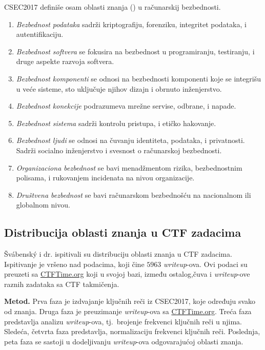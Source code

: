 \documentclass[12pt, a4paper, twocolumn]{article}
\begin{document}
CSEC2017 definiše osam oblasti znanja () u računarskij bezbednosti.
\begin{enumerate}
    \item \emph{Bezbednost podataka} sadrži kriptografiju, forenziku, 
        integritet podataka, i autentifikaciju.
    \item \emph{Bezbednost softvera} se fokusira na bezbednost u 
        programiranju, testiranju, i druge aspekte razvoja softvera.
    \item \emph{Bezbednost komponenti} se odnosi na bezbednosti komponenti 
        koje se integrišu u veće sisteme, sto uključuje njihov dizajn i 
        obrnuto inženjerstvo.
    \item \emph{Bezbednost konekcije} podrazumeva mrežne servise, odbrane, i 
        napade.
    \item \emph{Bezbednost sistema} sadrži kontrolu pristupa, i etičko 
        hakovanje.
    \item \emph{Bezbednost ljudi} se odnosi na čuvanju identiteta, podataka, 
        i privatnosti. Sadrži socialno inženjerstvo i svesnost o računarskoj 
        bezbednosti.
    \item \emph{Organizaciona bezbednost} se bavi menadžmentom rizika, 
        bezbednostnim polisama, i rukovanjem incidenata na nivou organizacije.
    \item \emph{Društvena bezbednost} se bavi računarskom bezbednošću 
        na nacionalnom ili globalnom nivou.
\end{enumerate}

\subsection{Distribucija oblasti znanja u CTF zadacima}

Švábenský i dr.\cite{ctf_skills} ispitivali su distribuciju oblasti znanja u 
CTF zadacima. Ispitivanje je vršeno nad podacima, koji čine $5963$ 
\emph{writeup}-ova. Ovi podaci su preuzeti sa \url{CTFTime.org} koji u svojoj 
bazi, između ostalog,čuva i \emph{writeup}-ove raznih zadataka sa CTF 
takmičenja.\cite{ctf_time}

\textbf{Metod.} Prva faza je izdvajanje ključnih reči iz CSEC2017, koje 
određuju svako od znanja. Druga faza je preuzimanje \emph{writeup}-ova sa 
\url{CTFTime.org}. Treća faza predstavlja analizu \emph{writeup}-ova, tj.\ 
brojenje frekvenci ključnih reči u njima. Sledeća, četvrta faza predstavlja, 
normalizaciju frekvenci ključnih reči. Poslednja, peta faza se sastoji u 
dodeljivanju \emph{writeup}-ova odgovarajućoj oblasti znanja.\cite{ctf_skills}
\end{document}
